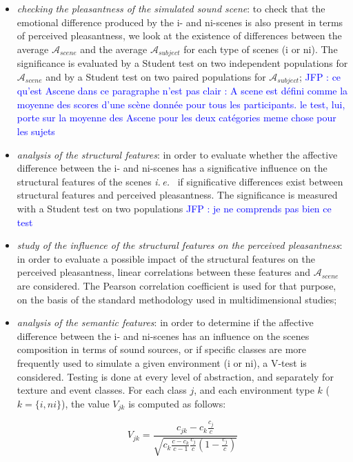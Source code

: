 \documentclass[preprint,12pt]{elsarticle}
\newcommand{\jfp}[1]{\textcolor{blue}{JFP : #1}}
\newcommand{\ie}{\emph{i.\,e.}}
\begin{document}
\begin{itemize}
\item \emph{checking the pleasantness of the simulated sound scene}: to check that the emotional difference produced by the i- and ni-scenes is also present in terms of perceived pleasantness, we look at the existence of differences between the average $\mathcal{A}_{scene}$ and the average $\mathcal{A}_{subject}$ for each type of scenes (i or ni). The significance is evaluated by a Student test on two independent populations for $\mathcal{A}_{scene}$ and by a Student test on two paired populations for $\mathcal{A}_{subject}$;
\jfp{ce qu'est Ascene dans ce paragraphe n'est pas clair :
A scene est défini comme la moyenne des scores d'une scène donnée pour tous les participants.
le test, lui, porte sur la moyenne des Ascene pour les deux catégories
meme chose pour les sujets}
\item \emph{analysis of the structural features}: in order to evaluate whether the affective difference between  the i- and ni-scenes has a significative influence  on the structural features of the scenes \ie~ if significative differences exist between structural features and perceived pleasantness. The significance is measured with a Student test on two populations \jfp{je ne comprends pas bien ce test}
\item \emph{study of the influence of the structural features on the perceived pleasantness}: in order to evaluate a possible impact of the structural features on the perceived pleasantness, linear correlations between these features and $\mathcal{A}_{scene}$ are considered. The Pearson correlation coefficient is used for that purpose, on the basis of the standard methodology used in multidimensional studies;
\item \emph{analysis of the semantic features}: in order to determine if the affective difference between  the i- and ni-scenes has an influence on the scenes composition in terms of sound sources, or if specific classes are more frequently used to simulate a given environment (i or ni), a V-test is considered. Testing is done at every level of abstraction, and separately for texture and event classes. For each class $j$, and each environment type $k$ ($k=\lbrace i,ni\rbrace$), the value $V_{jk}$ is computed as follows:

\begin{equation}
V_{jk}=\dfrac{c_{jk}-c_k\frac{c_j}{c}}{\sqrt{c_k\frac{c-c_k}{c-1}\frac{c_j}{c}(1-\frac{c_j}{c})}}
\end{equation}


\end{itemize}
\end{document}
